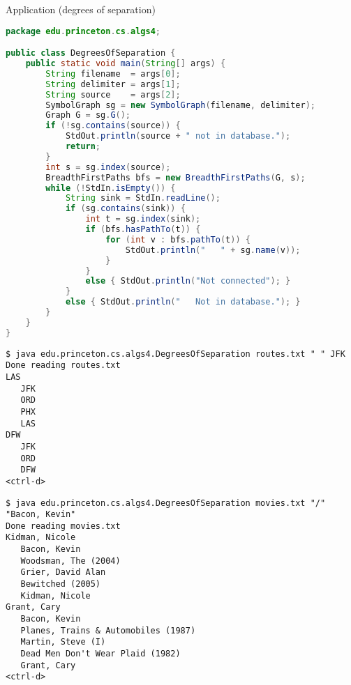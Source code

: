 \documentclass[8pt,a4paper,compress]{beamer}
\begin{document}
\begin{frame}[fragile]
\pause

Application (degrees of separation)
\begin{lstlisting}[language=java,style=focusin]
package edu.princeton.cs.algs4;

public class DegreesOfSeparation {
    public static void main(String[] args) {
        String filename  = args[0];
        String delimiter = args[1];
        String source    = args[2];
        SymbolGraph sg = new SymbolGraph(filename, delimiter);
        Graph G = sg.G();
        if (!sg.contains(source)) {
            StdOut.println(source + " not in database.");
            return;
        }
        int s = sg.index(source);
        BreadthFirstPaths bfs = new BreadthFirstPaths(G, s);
        while (!StdIn.isEmpty()) {
            String sink = StdIn.readLine();
            if (sg.contains(sink)) {
                int t = sg.index(sink);
                if (bfs.hasPathTo(t)) {
                    for (int v : bfs.pathTo(t)) {
                        StdOut.println("   " + sg.name(v));
                    }
                }
                else { StdOut.println("Not connected"); }
            }
            else { StdOut.println("   Not in database."); }
        }
    }
}
\end{lstlisting}
\end{frame}

\begin{frame}[fragile]
\pause

\begin{lstlisting}[language={},style=focusin]
$ java edu.princeton.cs.algs4.DegreesOfSeparation routes.txt " " JFK
Done reading routes.txt
LAS
   JFK
   ORD
   PHX
   LAS
DFW
   JFK
   ORD
   DFW
<ctrl-d>
\end{lstlisting}

\pause

\begin{lstlisting}[language={},style=focusin]
$ java edu.princeton.cs.algs4.DegreesOfSeparation movies.txt "/" "Bacon, Kevin"
Done reading movies.txt
Kidman, Nicole
   Bacon, Kevin
   Woodsman, The (2004)
   Grier, David Alan
   Bewitched (2005)
   Kidman, Nicole
Grant, Cary
   Bacon, Kevin
   Planes, Trains & Automobiles (1987)
   Martin, Steve (I)
   Dead Men Don't Wear Plaid (1982)
   Grant, Cary
<ctrl-d>
\end{lstlisting}
\end{frame}
\end{document}
